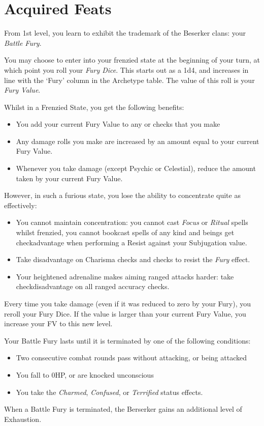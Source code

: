 \section*{Acquired Feats}

{
From 1st level, you learn to exhibit the trademark of the Beserker clans: your {\it Battle Fury}. 

You may choose to enter into your frenzied state at the beginning of your turn, at which point you roll your {\it Fury Dice}. This starts out as a 1d4, and increases in line with the `Fury' column in the Archetype table. The value of this roll is your {\it Fury Value}.


Whilst in a Frenzied State, you get the following benefits:

\begin{itemize}
	\item You add your current Fury Value to any \attPhys{} or \attSpr{} checks that you make
	\item Any damage rolls you make are increased by an amount equal to your current Fury Value. 
	\item Whenever you take damage (except Psychic or Celestial), reduce the amount taken by your current Fury Value. 
\end{itemize} 

However, in such a furious state, you lose the ability to concentrate quite as effectively:
\begin{itemize}
	\item You cannot maintain concentration: you cannot cast {\it Focus} or {\it Ritual} spells whilst frenzied, you cannot book\minus{}cast spells of any kind and beings get check\minus{}advantage when performing a Resist against your Subjugation value.  
	\item Take disadvantage on Charisma checks and checks to resist the {\it Fury} effect. 
	\item Your heightened adrenaline makes aiming ranged attacks harder: take check\minus{}disadvantage on all ranged accuracy checks.
\end{itemize}


Every time you take damage (even if it was reduced to zero by your Fury), you re\minus{}roll your Fury Dice. If the value is larger than your current Fury Value, you increase your FV to this new level.

Your Battle Fury lasts until it is terminated by one of the following conditions:
\begin{itemize}
	\item Two consecutive combat rounds pass without attacking, or being attacked
	\item You fall to 0HP, or are knocked unconscious
	\item You take the {\it Charmed}, {\it Confused}, or {\it Terrified} status effects. 
\end{itemize}

When a Battle Fury is terminated, the Berserker gains an additional level of Exhaustion. 

}

